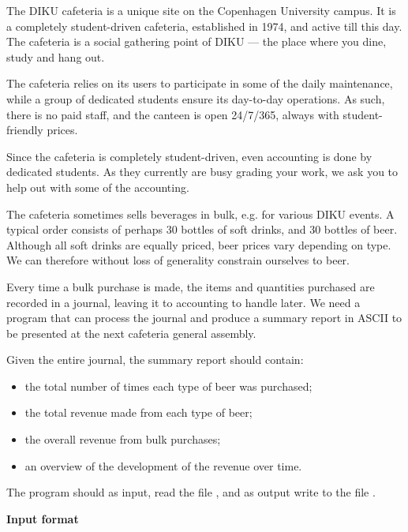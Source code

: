 
The DIKU cafeteria is a unique site on the Copenhagen University campus. It is
a completely student-driven cafeteria, established in 1974, and active till
this day. The cafeteria is a social gathering point of DIKU --- the place where
you dine, study and hang out.

The cafeteria relies on its users to participate in some of the daily
maintenance, while a group of dedicated students ensure its day-to-day
operations. As such, there is no paid staff, and the canteen is open 24/7/365,
always with student-friendly prices.

Since the cafeteria is completely student-driven, even accounting is done by
dedicated students. As they currently are busy grading your work, we ask you to
help out with some of the accounting.

The cafeteria sometimes sells beverages in bulk, e.g. for various DIKU events.
A typical order consists of perhaps 30 bottles of soft drinks, and 30 bottles
of beer.  Although all soft drinks are equally priced, beer prices vary
depending on type. We can therefore without loss of generality constrain
ourselves to beer.

Every time a bulk purchase is made, the items and quantities purchased are
recorded in a journal, leaving it to accounting to handle later. We need a
program that can process the journal and produce a summary report in ASCII to
be presented at the next cafeteria general assembly.

Given the entire journal, the summary report should contain:

\begin{itemize}

\item the total number of times each type of beer was purchased;

\item the total revenue made from each type of beer;

\item the overall revenue from bulk purchases;

\item an overview of the development of the revenue over time.

\end{itemize}

The program should as input, read the file , and as output write
to the file .

{\bf Input format}

